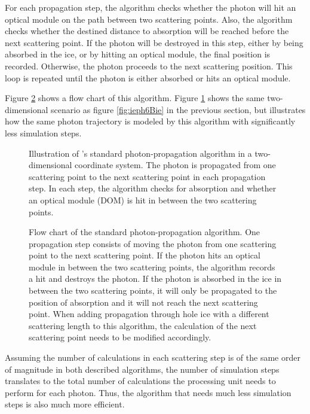 For each propagation step, the algorithm checks whether the photon will hit an optical module on the path between two scattering points. Also, the algorithm checks whether the destined distance to absorption will be reached before the next scattering point. If the photon will be destroyed in this step, either by being absorbed in the ice, or by hitting an optical module, the final position is recorded. Otherwise, the photon proceeds to the next scattering position. This loop is repeated until the photon is either absorbed or hits an optical module. \cite{ppcpaper}

Figure \ref{fig:Ar0vai8u} shows a flow chart of this algorithm. Figure \ref{fig:oheeL3ai} shows the same two-dimensional scenario as figure \ref{fig:ieph6Bie} in the previous section, but illustrates how the same photon trajectory is modeled by this algorithm with significantly less simulation steps.

\begin{figure}[htbp]
  \caption{Illustration of \icecube's standard photon-propagation algorithm in a two-dimensional coordinate system. The photon is propagated from one scattering point to the next scattering point in each propagation step. In each step, the algorithm checks for absorption and whether an optical module (DOM) is hit in between the two scattering points.}
  \label{fig:oheeL3ai}
\end{figure}

\begin{figure}[p]
  \caption{Flow chart of the standard photon-propagation algorithm. One propagation step consists of moving the photon from one scattering point to the next scattering point. If the photon hits an optical module in between the two scattering points, the algorithm records a hit and destroys the photon. If the photon is absorbed in the ice in between the two scattering points, it will only be propagated to the position of absorption and it will not reach the next scattering point. When adding propagation through hole ice with a different scattering length to this algorithm, the calculation of the next scattering point needs to be modified accordingly.}
  \label{fig:Ar0vai8u}
\end{figure}

Assuming the number of calculations in each scattering step is of the same order of magnitude in both described algorithms, the number of simulation steps translates to the total number of calculations the processing unit needs to perform for each photon. Thus, the algorithm that needs much less simulation steps is also much more efficient.

